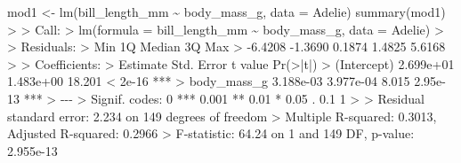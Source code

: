 \documentclass[
  letterpaper,
]{book}
\newenvironment{Shaded}{\begin{snugshade}}{\end{snugshade}}
\newcommand{\AttributeTok}[1]{\textcolor[rgb]{0.40,0.45,0.13}{#1}}
\newcommand{\DecValTok}[1]{\textcolor[rgb]{0.68,0.00,0.00}{#1}}
\newcommand{\ErrorTok}[1]{\textcolor[rgb]{0.68,0.00,0.00}{#1}}
\newcommand{\FloatTok}[1]{\textcolor[rgb]{0.68,0.00,0.00}{#1}}
\newcommand{\FunctionTok}[1]{\textcolor[rgb]{0.28,0.35,0.67}{#1}}
\newcommand{\NormalTok}[1]{\textcolor[rgb]{0.00,0.23,0.31}{#1}}
\newcommand{\OtherTok}[1]{\textcolor[rgb]{0.00,0.23,0.31}{#1}}
\newcommand{\SpecialCharTok}[1]{\textcolor[rgb]{0.37,0.37,0.37}{#1}}
\newcommand{\StringTok}[1]{\textcolor[rgb]{0.13,0.47,0.30}{#1}}
\begin{document}
\begin{Shaded}
\begin{Highlighting}[]
\NormalTok{mod1 }\OtherTok{\textless{}{-}} \FunctionTok{lm}\NormalTok{(bill\_length\_mm }\SpecialCharTok{\textasciitilde{}}\NormalTok{ body\_mass\_g,}
           \AttributeTok{data =}\NormalTok{ Adelie)}
\FunctionTok{summary}\NormalTok{(mod1)}
\SpecialCharTok{\textgreater{}} 
\ErrorTok{\textgreater{}}\NormalTok{ Call}\SpecialCharTok{:}
\ErrorTok{\textgreater{}} \FunctionTok{lm}\NormalTok{(}\AttributeTok{formula =}\NormalTok{ bill\_length\_mm }\SpecialCharTok{\textasciitilde{}}\NormalTok{ body\_mass\_g, }\AttributeTok{data =}\NormalTok{ Adelie)}
\SpecialCharTok{\textgreater{}} 
\ErrorTok{\textgreater{}}\NormalTok{ Residuals}\SpecialCharTok{:}
\ErrorTok{\textgreater{}}\NormalTok{     Min      }\DecValTok{1}\NormalTok{Q  Median      }\DecValTok{3}\NormalTok{Q     Max }
\SpecialCharTok{\textgreater{}} \SpecialCharTok{{-}}\FloatTok{6.4208} \SpecialCharTok{{-}}\FloatTok{1.3690}  \FloatTok{0.1874}  \FloatTok{1.4825}  \FloatTok{5.6168} 
\SpecialCharTok{\textgreater{}} 
\ErrorTok{\textgreater{}}\NormalTok{ Coefficients}\SpecialCharTok{:}
\ErrorTok{\textgreater{}}\NormalTok{              Estimate Std. Error t value }\FunctionTok{Pr}\NormalTok{(}\SpecialCharTok{\textgreater{}}\ErrorTok{|}\NormalTok{t}\SpecialCharTok{|}\NormalTok{)    }
\SpecialCharTok{\textgreater{}}\NormalTok{ (Intercept) }\FloatTok{2.699e+01}  \FloatTok{1.483e+00}  \FloatTok{18.201}  \SpecialCharTok{\textless{}} \FloatTok{2e{-}16} \SpecialCharTok{**}\ErrorTok{*}
\ErrorTok{\textgreater{}}\NormalTok{ body\_mass\_g }\FloatTok{3.188e{-}03}  \FloatTok{3.977e{-}04}   \FloatTok{8.015} \FloatTok{2.95e{-}13} \SpecialCharTok{**}\ErrorTok{*}
\ErrorTok{\textgreater{}} \SpecialCharTok{{-}{-}{-}}
\ErrorTok{\textgreater{}}\NormalTok{ Signif. codes}\SpecialCharTok{:}  \DecValTok{0} \StringTok{\textquotesingle{}***\textquotesingle{}} \FloatTok{0.001} \StringTok{\textquotesingle{}**\textquotesingle{}} \FloatTok{0.01} \StringTok{\textquotesingle{}*\textquotesingle{}} \FloatTok{0.05} \StringTok{\textquotesingle{}.\textquotesingle{}} \FloatTok{0.1} \StringTok{\textquotesingle{} \textquotesingle{}} \DecValTok{1}
\SpecialCharTok{\textgreater{}} 
\ErrorTok{\textgreater{}}\NormalTok{ Residual standard error}\SpecialCharTok{:} \FloatTok{2.234}\NormalTok{ on }\DecValTok{149}\NormalTok{ degrees of freedom}
\SpecialCharTok{\textgreater{}}\NormalTok{ Multiple R}\SpecialCharTok{{-}}\NormalTok{squared}\SpecialCharTok{:}  \FloatTok{0.3013}\NormalTok{,  Adjusted R}\SpecialCharTok{{-}}\NormalTok{squared}\SpecialCharTok{:}  \FloatTok{0.2966} 
\SpecialCharTok{\textgreater{}}\NormalTok{ F}\SpecialCharTok{{-}}\NormalTok{statistic}\SpecialCharTok{:} \FloatTok{64.24}\NormalTok{ on }\DecValTok{1}\NormalTok{ and }\DecValTok{149}\NormalTok{ DF,  p}\SpecialCharTok{{-}}\NormalTok{value}\SpecialCharTok{:} \FloatTok{2.955e{-}13}
\end{Highlighting}
\end{Shaded}
\end{document}
